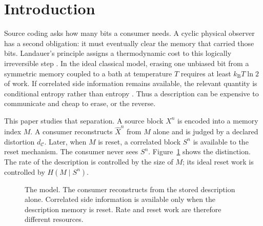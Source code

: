 \documentclass[letterpaper,onecolumn]{IEEEtran}
\theoremstyle{definition}
\theoremstyle{remark}
\newcommand{\cC}{\mathcal{C}}
\newcommand{\hXn}{\widehat{X}^{n}}
\newcommand{\1}{\mathbf{1}}
\newcommand{\kb}{k_{\mathrm B}}
\begin{document}
\IEEEpeerreviewmaketitle

\section{Introduction}\label{sec:intro}

Source coding asks how many bits a consumer needs. A cyclic physical observer
has a second obligation: it must eventually clear the memory that carried those
bits. Landauer's principle assigns a thermodynamic cost to this logically
irreversible step \cite{landauer1961,bennett1973}. In the ideal classical model,
erasing one unbiased bit from a symmetric memory coupled to a bath at
temperature $T$ requires at least $\kb T\ln 2$ of work. If correlated side
information remains available, the relevant quantity is conditional entropy
rather than entropy \cite{delrio2011,faist2015}. Thus a description can be
expensive to communicate and cheap to erase, or the reverse.

This paper studies that separation. A source block $X^n$ is encoded into a
memory index $M$. A consumer reconstructs $\hXn$ from $M$ alone and is judged by
a declared distortion $d_{\cC}$. Later, when $M$ is reset, a correlated block
$S^n$ is available to the reset mechanism. The consumer never sees $S^n$.
Figure~\ref{fig:model} shows the distinction. The rate of the description is
controlled by the size of $M$; its ideal reset work is controlled by
$H(M\mid S^n)$.

\begin{figure}[!t]
\centering
{}
\caption{The model. The consumer reconstructs from the stored description alone.
Correlated side information is available only when the description memory is
reset. Rate and reset work are therefore different resources.}
\label{fig:model}
\end{figure}
\end{document}
